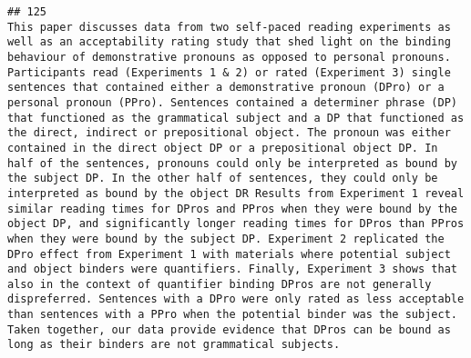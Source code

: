 \documentclass[
  english,
  man]{apa6}
\begin{document}
\begin{verbatim}
## 125                                                                                                                                                                                                                                                                                                                                                                                                                                                                                                                                                                                                                                                                                                                                                                                                                                                                                                                                                                                                                                                                                                         This paper discusses data from two self-paced reading experiments as well as an acceptability rating study that shed light on the binding behaviour of demonstrative pronouns as opposed to personal pronouns. Participants read (Experiments 1 & 2) or rated (Experiment 3) single sentences that contained either a demonstrative pronoun (DPro) or a personal pronoun (PPro). Sentences contained a determiner phrase (DP) that functioned as the grammatical subject and a DP that functioned as the direct, indirect or prepositional object. The pronoun was either contained in the direct object DP or a prepositional object DP. In half of the sentences, pronouns could only be interpreted as bound by the subject DP. In the other half of sentences, they could only be interpreted as bound by the object DR Results from Experiment 1 reveal similar reading times for DPros and PPros when they were bound by the object DP, and significantly longer reading times for DPros than PPros when they were bound by the subject DP. Experiment 2 replicated the DPro effect from Experiment 1 with materials where potential subject and object binders were quantifiers. Finally, Experiment 3 shows that also in the context of quantifier binding DPros are not generally dispreferred. Sentences with a DPro were only rated as less acceptable than sentences with a PPro when the potential binder was the subject. Taken together, our data provide evidence that DPros can be bound as long as their binders are not grammatical subjects.

\end{verbatim}
\end{document}
